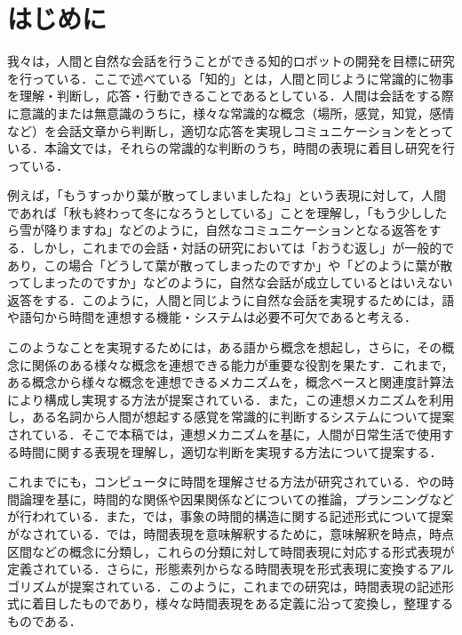

\maketitle


\section{はじめに}
我々は，人間と自然な会話を行うことができる知的ロボットの開発を目標に研究を行っている．ここで述べている「知的」とは，人間と同じように常識的に物事を理解・判断し，応答・行動できることであるとしている．人間は会話をする際に意識的または無意識のうちに，様々な常識的な概念（場所，感覚，知覚，感情など）を会話文章から判断し，適切な応答を実現しコミュニケーションをとっている．本論文では，それらの常識的な判断のうち，時間の表現に着目し研究を行っている．

例えば，「もうすっかり葉が散ってしまいましたね」という表現に対して，人間であれば「秋も終わって冬になろうとしている」ことを理解し，「もう少ししたら雪が降りますね」などのように，自然なコミュニケーションとなる返答をする．しかし，これまでの会話・対話の研究においては「おうむ返し」が一般的であり，この場合「どうして葉が散ってしまったのですか」や「どのように葉が散ってしまったのですか」などのように，自然な会話が成立しているとはいえない返答をする．このように，人間と同じように自然な会話を実現するためには，語や語句から時間を連想する機能・システムは必要不可欠であると考える．

このようなことを実現するためには，ある語から概念を想起し，さらに，その概念に関係のある様々な概念を連想できる能力が重要な役割を果たす．これまで，ある概念から様々な概念を連想できるメカニズムを，概念ベース\cite{hirose:02,kojima:02}と関連度計算法\cite{watabe:01}により構成し実現する方法が提案されている．また，この連想メカニズムを利用し，ある名詞から人間が想起する感覚を常識的に判断するシステム\cite{horiguchi:02,watabe:04}について提案されている．そこで本稿では，連想メカニズムを基に，人間が日常生活で使用する時間に関する表現を理解し，適切な判断を実現する方法について提案する．

これまでにも，コンピュータに時間を理解させる方法が研究されている．\cite{allen:84}や\cite{mcdermott:82}の時間論理を基に，時間的な関係や因果関係などについての推論，プランニングなどが行われている．また，\cite{tamano:96}では，事象の時間的構造に関する記述形式について提案がなされている．\cite{mizobuchi:99}では，時間表現を意味解釈するために，意味解釈を時点，時点区間などの概念に分類し，これらの分類に対して時間表現に対応する形式表現が定義されている．さらに，形態素列からなる時間表現を形式表現に変換するアルゴリズムが提案されている．このように，これまでの研究は，時間表現の記述形式に着目したものであり，様々な時間表現をある定義に沿って変換し，整理するものである．

